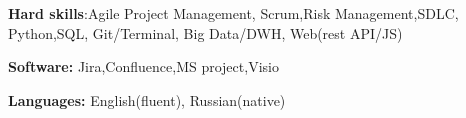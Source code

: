  \textbf{Hard skills}:Agile Project Management, Scrum,Risk Management,SDLC,\\ \tab
Python,SQL, Git/Terminal, Big Data/DWH, Web(rest API/JS)


 \textbf{Software:} Jira,Confluence,MS project,Visio

 \textbf{Languages:}  English(fluent),  Russian(native)